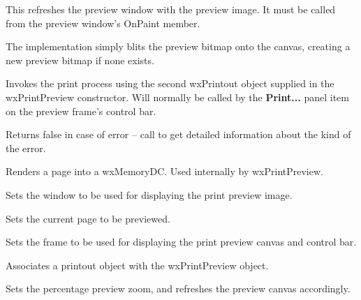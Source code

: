 \label{wxprintpreviewpaintpage}


This refreshes the preview window with the preview image.
It must be called from the preview window's OnPaint member.

The implementation simply blits the preview bitmap onto
the canvas, creating a new preview bitmap if none exists.

\label{wxprintpreviewprint}


Invokes the print process using the second wxPrintout object
supplied in the wxPrintPreview constructor.
Will normally be called by the {\bf Print...} panel item on the
preview frame's control bar.

Returns false in case of error -- call
 to get detailed
information about the kind of the error.

\label{wxprintpreviewrenderpage}


Renders a page into a wxMemoryDC. Used internally by wxPrintPreview.

\label{wxprintpreviewsetcanvas}


Sets the window to be used for displaying the print preview image.

\label{wxprintpreviewsetcurrentpage}


Sets the current page to be previewed.

\label{wxprintpreviewsetframe}


Sets the frame to be used for displaying the print preview canvas
and control bar.

\label{wxprintpreviewsetprintout}


Associates a printout object with the wxPrintPreview object.

\label{wxprintpreviewsetzoom}


Sets the percentage preview zoom, and refreshes the preview canvas
accordingly.


